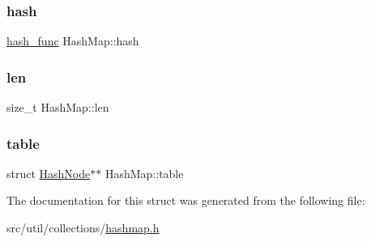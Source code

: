 \hypertarget{structHashMap_a0b8167af29685811df0d063df7e9cf8e}{}\label{structHashMap_a0b8167af29685811df0d063df7e9cf8e} 
\subsubsection{\texorpdfstring{hash}{hash}}
{\footnotesize\ttfamily \hyperlink{hashmap_8h_a21bba600ec628a973f640c2b9658acef}{hash\+\_\+func} Hash\+Map\+::hash}

\hypertarget{structHashMap_a464e5e54144c37706fe47c69371150a0}{}\label{structHashMap_a464e5e54144c37706fe47c69371150a0} 
\subsubsection{\texorpdfstring{len}{len}}
{\footnotesize\ttfamily size\+\_\+t Hash\+Map\+::len}

\hypertarget{structHashMap_a9b6b4ce667e2fba22eeedef8a67bd16e}{}\label{structHashMap_a9b6b4ce667e2fba22eeedef8a67bd16e} 
\subsubsection{\texorpdfstring{table}{table}}
{\footnotesize\ttfamily struct \hyperlink{structHashNode}{Hash\+Node}$\ast$$\ast$ Hash\+Map\+::table}



The documentation for this struct was generated from the following file\+:\begin{DoxyCompactItemize}
\item 
src/util/collections/\hyperlink{hashmap_8h}{hashmap.\+h}\end{DoxyCompactItemize}
